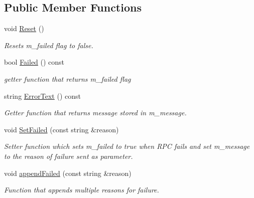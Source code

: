 \subsection*{Public Member Functions}
\begin{DoxyCompactItemize}
\item 
\mbox{\label{classcoappbrpc_1_1ControllerRPC_aac8d7a0e52a017d60a411a462bad6d91}} 
void \hyperlink{classcoappbrpc_1_1ControllerRPC_aac8d7a0e52a017d60a411a462bad6d91}{Reset} ()
\begin{DoxyCompactList}\small\item\em Resets m\+\_\+failed flag to false. \end{DoxyCompactList}\item 
\mbox{\label{classcoappbrpc_1_1ControllerRPC_a20a3b119687bea2ac836db07a3b04287}} 
bool \hyperlink{classcoappbrpc_1_1ControllerRPC_a20a3b119687bea2ac836db07a3b04287}{Failed} () const
\begin{DoxyCompactList}\small\item\em getter function that returns m\+\_\+failed flag \end{DoxyCompactList}\item 
\mbox{\label{classcoappbrpc_1_1ControllerRPC_a96035415234221d2972a3f2f790275ce}} 
string \hyperlink{classcoappbrpc_1_1ControllerRPC_a96035415234221d2972a3f2f790275ce}{Error\+Text} () const
\begin{DoxyCompactList}\small\item\em Getter function that returns message stored in m\+\_\+message. \end{DoxyCompactList}\item 
void \hyperlink{classcoappbrpc_1_1ControllerRPC_a3d91a6d0ba16232c531c3313e4412212}{Set\+Failed} (const string \&reason)
\begin{DoxyCompactList}\small\item\em Setter function which sets m\+\_\+failed to true when R\+PC fails and set m\+\_\+message to the reason of failure sent as parameter. \end{DoxyCompactList}\item 
void \hyperlink{classcoappbrpc_1_1ControllerRPC_a480586532b344e3ca8da2d2519ba593f}{append\+Failed} (const string \&reason)
\begin{DoxyCompactList}\small\item\em Function that appends multiple reasons for failure. \end{DoxyCompactList}\item 

\end{DoxyCompactItemize}
